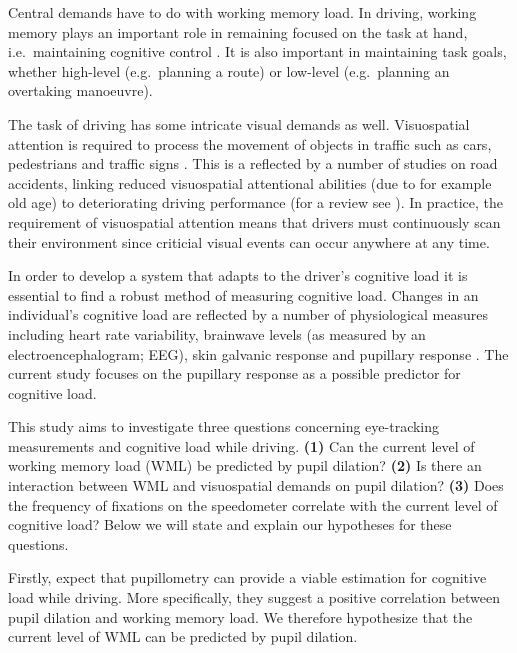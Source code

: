 Central demands have to do with working memory load.
In driving, working memory plays an important role in remaining focused on the task at hand, i.e.\ maintaining cognitive control \citep{Wood2016}.
It is also important in maintaining task goals, whether high-level (e.g.\ planning a route) or low-level (e.g.\ planning an overtaking manoeuvre).

The task of driving has some intricate visual demands as well.
Visuospatial attention is required to process the movement of objects in traffic such as cars, pedestrians and traffic signs \citep{Zheng2020}.
This is a reflected by a number of studies on road accidents, linking reduced visuospatial attentional abilities (due to for example old age) to deteriorating driving performance (for a review see \citet{Owsley2010}).
In practice, the requirement of visuospatial attention means that drivers must continuously scan their environment since criticial visual events can occur anywhere at any time.

In order to develop a system that adapts to the driver's cognitive load it is essential to find a robust method of measuring cognitive load.
Changes in an individual's cognitive load are reflected by a number of physiological measures including heart rate variability, brainwave levels (as measured by an electroencephalogram; EEG), skin galvanic response and pupillary response \citep{Haapalainen2010}.
The current study focuses on the pupillary response as a possible predictor for cognitive load.

This study aims to investigate three questions concerning eye-tracking measurements and cognitive load while driving.
\textbf{(1)} Can the current level of working memory load (WML) be predicted by pupil dilation?
\textbf{(2)} Is there an interaction between WML and visuospatial demands on pupil dilation?
\textbf{(3)} Does the frequency of fixations on the speedometer correlate with the current level of cognitive load?
Below we will state and explain our hypotheses for these questions. 

Firstly, \citet{Palinko2010} expect that pupillometry can provide a viable estimation for cognitive load while driving. 
More specifically, they suggest a positive correlation between pupil dilation and working memory load.
We therefore hypothesize that the current level of WML can be predicted by pupil dilation.

